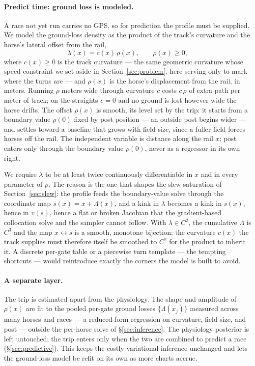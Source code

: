 \documentclass[11pt]{article}
\begin{document}
\paragraph{Predict time: ground loss is modeled.} A race not yet run carries no GPS, so for prediction the profile must be supplied. We model the ground-loss density as the product of the track's curvature and the horse's lateral offset from the rail,
\begin{equation}\label{eq:lambda}
\lambda(x) = c(x)\,\rho(x), \qquad \rho(x) \geq 0,
\end{equation}
where $c(x) \geq 0$ is the track curvature --- the same geometric curvature whose speed constraint we set aside in Section~\ref{sec:problem}, here serving only to mark where the turns are --- and $\rho(x)$ is the horse's displacement from the rail, in meters. Running $\rho$ meters wide through curvature $c$ costs $c\,\rho$ of extra path per meter of track; on the straights $c = 0$ and no ground is lost however wide the horse drifts. The offset $\rho(x)$ is smooth, its level set by the trip: it starts from a boundary value $\rho(0)$ fixed by post position --- an outside post begins wider --- and settles toward a baseline that grows with field size, since a fuller field forces horses off the rail. The independent variable is distance along the rail $x$; post enters only through the boundary value $\rho(0)$, never as a regressor in its own right.

We require $\lambda$ to be at least twice continuously differentiable in $x$ and in every parameter of $\rho$. The reason is the one that shapes the slew saturation of Section~\ref{sec:slew}: the profile feeds the boundary-value solve through the coordinate map $s(x) = x + \Lambda(x)$, and a kink in $\lambda$ becomes a kink in $s(x)$, hence in $v(s)$, hence a flat or broken Jacobian that the gradient-based collocation solve and the sampler cannot follow. With $\lambda \in C^2$, the cumulative $\Lambda$ is $C^3$ and the map $x \leftrightarrow s$ is a smooth, monotone bijection; the curvature $c(x)$ the track supplies must therefore itself be smoothed to $C^2$ for the product to inherit it. A discrete per-gate table or a piecewise turn template --- the tempting shortcuts --- would reintroduce exactly the corners the model is built to avoid.

\paragraph{A separate layer.} The trip is estimated apart from the physiology. The shape and amplitude of $\rho(x)$ are fit to the pooled per-gate ground losses $\{\Lambda(x_j)\}$ measured across many horses and races --- a reduced-form regression on curvature, field size, and post --- outside the per-horse solve of \S\ref{sec:inference}. The physiology posterior is left untouched; the trip enters only when the two are combined to predict a race (\S\ref{sec:predictive}). This keeps the costly variational inference unchanged and lets the ground-loss model be refit on its own as more charts accrue.
\end{document}
